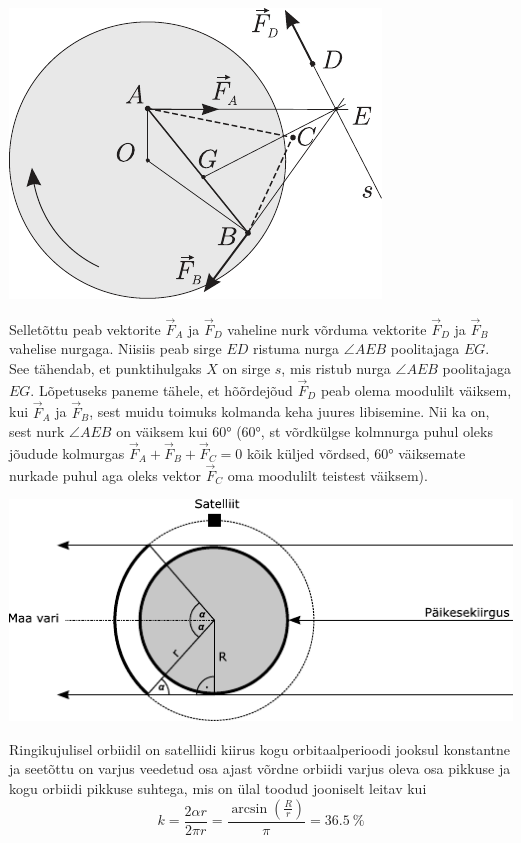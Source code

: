 \documentclass[10pt]{article}
\begin{document}
{\begin{center}
	\includegraphics[width=0.7\linewidth]{2005-v3g-10-lah}
\end{center}

Selletõttu peab vektorite $\vec F_A$ ja $\vec F_D$ vaheline nurk võrduma vektorite $\vec F_D$ ja $\vec F_B$ vahelise nurgaga. Niisiis peab sirge $ED$ ristuma nurga $\angle AEB$ poolitajaga $EG$. See tähendab, et punktihulgaks $X$ on sirge $s$, mis ristub nurga $\angle AEB$ poolitajaga $EG$. Lõpetuseks paneme tähele, et hõõrdejõud $\vec F_D$ peab olema moodulilt väiksem, kui $\vec F_A$ ja $\vec F_B$, sest muidu toimuks kolmanda keha juures libisemine. Nii ka on, sest nurk $\angle AEB$ on väiksem kui \ang{60} (\ang{60}, st võrdkülgse kolmnurga puhul oleks jõudude kolmurgas $\vec F_A + \vec F_B + \vec F_C = 0$ kõik küljed võrdsed, \ang{60} väiksemate nurkade puhul aga oleks vektor $\vec F_C$ oma moodulilt teistest väiksem).
\probend
\bigskip


\solu
\begin{center}
	\includegraphics[width=0.9\linewidth]{2011-v2g-02-lah}
\end{center}
Ringikujulisel orbiidil on satelliidi kiirus kogu orbitaalperioodi jooksul konstantne ja seetõttu on varjus veedetud osa ajast võrdne orbiidi varjus oleva osa pikkuse ja kogu orbiidi pikkuse suhtega, mis on ülal toodud jooniselt leitav kui 
\[
k=\frac{2 \alpha r}{2 \pi r}=\frac{\arcsin \left(\frac{R}{r}\right)}{\pi}=\SI{36,5}{\%}
\]
\probend
\bigskip

}
\end{document}
